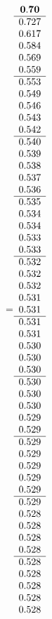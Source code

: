 =\hbox{$\begin{array}{c}
\bf 0.70 
 \\ \hline 
   0.727 \\ 
   0.617 \\ 
   0.584 \\ 
   0.569 \\ 
   0.559
 \\ \hline 
   0.553 \\ 
   0.549 \\ 
   0.546 \\ 
   0.543 \\ 
   0.542
 \\ \hline 
   0.540 \\ 
   0.539 \\ 
   0.538 \\ 
   0.537 \\ 
   0.536
 \\ \hline 
   0.535 \\ 
   0.534 \\ 
   0.534 \\ 
   0.533 \\ 
   0.533
 \\ \hline 
   0.532 \\ 
   0.532 \\ 
   0.532 \\ 
   0.531 \\ 
   0.531
 \\ \hline 
   0.531 \\ 
   0.531 \\ 
   0.530 \\ 
   0.530 \\ 
   0.530
 \\ \hline 
   0.530 \\ 
   0.530 \\ 
   0.530 \\ 
   0.529 \\ 
   0.529
 \\ \hline 
   0.529 \\ 
   0.529 \\ 
   0.529 \\ 
   0.529 \\ 
   0.529
 \\ \hline 
   0.529 \\ 
   0.528 \\ 
   0.528 \\ 
   0.528 \\ 
   0.528
 \\ \hline 
   0.528 \\ 
   0.528 \\ 
   0.528 \\ 
   0.528 \\ 
   0.528
 \end{array}$}
